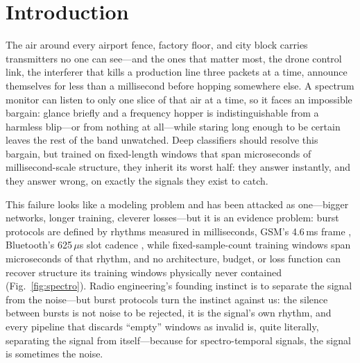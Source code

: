 \documentclass[10pt,twocolumn]{article}
\begin{document}
\section{Introduction}
The air around every airport fence, factory floor, and city block carries
transmitters no one can see---and the ones that matter most, the drone
control link, the interferer that kills a production line three packets at a
time, announce themselves for less than a millisecond before hopping
somewhere else. A spectrum monitor can listen to only one slice of that air
at a time, so it faces an impossible bargain: glance briefly and a frequency
hopper is indistinguishable from a harmless blip---or from nothing at
all---while staring long enough to be certain leaves the rest of the band
unwatched. Deep classifiers \cite{oshea2016,oshea2018} should resolve this
bargain, but trained on fixed-length windows that span microseconds of
millisecond-scale structure, they inherit its worst half: they answer
instantly, and they answer wrong, on exactly the signals they exist to
catch.

This failure looks like a modeling problem and has been attacked as
one---bigger networks, longer training, cleverer losses---but it is an
evidence problem: burst protocols are defined by rhythms measured in
milliseconds, GSM's 4.6\,ms frame \cite{ts45002}, Bluetooth's 625\,$\mu$s
slot cadence \cite{btcore}, while fixed-sample-count training windows span
microseconds of that rhythm, and no architecture, budget, or loss function
can recover structure its training windows physically never contained
(Fig.~\ref{fig:spectro}). Radio engineering's founding instinct is to
separate the signal from the noise---but burst protocols turn the instinct
against us: the silence between bursts is not noise to be rejected, it is
the signal's own rhythm, and every pipeline that discards ``empty'' windows
as invalid is, quite literally, separating the signal from itself---because
for spectro-temporal signals, the signal is sometimes the noise.
\end{document}
